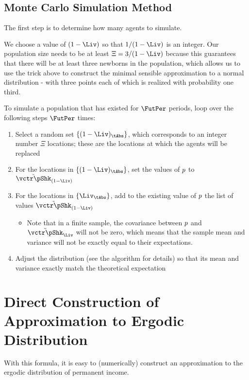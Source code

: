 \documentclass[../BufferStockTheory.tex]{subfiles}\usepackage{ApndxSteadyState}
\begin{document}
  \subsection{Monte Carlo Simulation Method}

  The first step is to determine how many agents to simulate.

  \newcommand{\popMult}{\Xi}

  We choose a value of $\Die$ so that $1/\Die$ is an integer.  Our population size needs to be at least $\popMult = 3/\Die$ because this guarantees that there will be at least three newborns in the population, which allows us to use the trick above to construct the minimal sensible approximation to a normal distribution - with three points each of which is realized with probability one third.

  To simulate a population that has existed for $\FutPer$ periods, loop over the following steps $\FutPer$ times:
  \begin{enumerate}
  \item Select a random set $\{\Die_{\tAbs}\}$, which corresponds to an integer number $\popMult$ locations; these are the locations at which the agents will be replaced 
  \item For the locations in $\{\Die_{\tAbs}\}$, set the values of $p$ to $\pShkNewRemix$
  \item For the locations in $\{\Liv_{\tAbs}\}$, add to the existing value of $p$ the list of values $\pShkNewRemix$
    \begin{itemize}
    \item Note that in a finite sample, the covariance between $p$ and $\pShkOldRemix$ will not be zero, which means that the sample mean and variance will not be exactly equal to their expectations.
    \end{itemize}
\item Adjust the distribution (see the algorithm for details) so that its mean and variance exactly match the theoretical expectation    
  \end{enumerate}

  \section{Direct Construction of Approximation to Ergodic Distribution}

  With this formula, it is easy to (numerically) construct an approximation to the ergodic distribution of permanent income.
\end{document}
